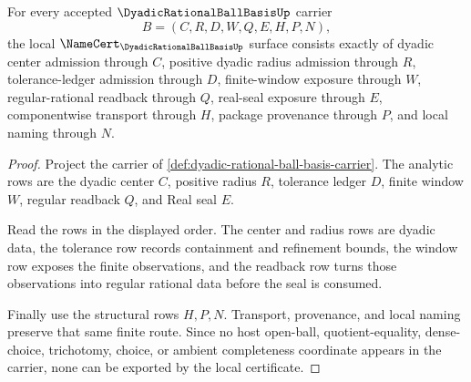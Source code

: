 \begin{theorem}
\label{thm:dyadic-rational-ball-basis-namecert-obligations}
For every accepted $\DyadicRationalBallBasisUp$ carrier
$$
B=(C,R,D,W,Q,E,H,P,N),
$$
the local $\NameCert_{\DyadicRationalBallBasisUp}$ surface consists exactly of dyadic center admission through $C$, positive dyadic radius admission through $R$, tolerance-ledger admission through $D$, finite-window exposure through $W$, regular-rational readback through $Q$, real-seal exposure through $E$, componentwise transport through $H$, package provenance through $P$, and local naming through $N$.
\end{theorem}
\begin{proof}
Project the carrier of \autoref{def:dyadic-rational-ball-basis-carrier}. The analytic rows are the dyadic center $C$, positive radius $R$, tolerance ledger $D$, finite window $W$, regular readback $Q$, and Real seal $E$.

Read the rows in the displayed order. The center and radius rows are dyadic data, the tolerance row records containment and refinement bounds, the window row exposes the finite observations, and the readback row turns those observations into regular rational data before the seal is consumed.

Finally use the structural rows $H,P,N$. Transport, provenance, and local naming preserve that same finite route. Since no host open-ball, quotient-equality, dense-choice, trichotomy, choice, or ambient completeness coordinate appears in the carrier, none can be exported by the local certificate.
\end{proof}

